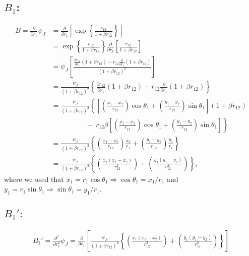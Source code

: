 \documentclass[a4paper,10pt]{article}
\newcommand{\pder}[2]{\frac{\partial #1}{\partial #2}}       %
\newcommand{\nn}{\nonumber}
\begin{document}
\subsection*{$B_1$:}
\begin{align}
B = \pder{}{r_1}\psi_J &= \pder{}{r_1} \left[ \exp\left\{\frac{r_{12}}{1+\beta r_{12}} \right\} \right] \nn\\
&= \exp\left\{\frac{r_{12}}{1+\beta r_{12}} \right\}\pder{}{r_1}\left[\frac{r_{12}}{1+\beta r_{12}} \right] \nn\\
&= \psi_J \left[\frac{\pder{r_{12}}{r_1}\left(1+\beta r_{12}\right)-r_{12} \pder{}{r_1}\left(1+\beta r_{12} \right)}{\left(1+\beta r_{12}\right)^2} \right] \nn\\
&= \frac{\psi_J}{\left(1+\beta r_{12}\right)^2}\left\{\pder{r_{12}}{r_1}\left(1+\beta r_{12}\right)-r_{12} \pder{}{r_1}\left(1+\beta r_{12} \right) \right\} \nn\\
&= \frac{\psi_J}{\left(1+\beta r_{12}\right)^2} \left\{\left[\left(\frac{x_1-x_2}{r_{12}}\right)\cos\theta_1 + \left(\frac{y_1-y_2}{r_{12}}\right)\sin\theta_1\right]\left(1+\beta r_{12}\right) \right. \nn\\
& \left. \ \ \ \ \ \ \ \ \ \ \ \ \ \ \ \ \ \ \ \ \ \ - \  r_{12} \beta \left[\left(\frac{x_1-x_2}{r_{12}}\right)\cos\theta_1 + \left(\frac{y_1-y_2}{r_{12}}\right)\sin\theta_1 \right]  \right\} \nn\\
&= \frac{\psi_J}{\left(1+\beta r_{12}\right)^2} \left\{\left(\frac{x_1-x_2}{r_{12}}\right)\frac{x_1}{r_1} + \left(\frac{y_1-y_2}{r_{12}}\right)\frac{y_1}{r_1} \right\} \nn\\
&= \frac{\psi_J}{\left(1+\beta r_{12}\right)^2} \left\{\left(\frac{x_1(x_1-x_2)}{r_{12}^2}\right) + \left(\frac{y_1(y_1-y_2)}{r_{12}^2}\right)\right\},
\end{align}
where we used that $x_1=r_1\cos\theta_1\Rightarrow \cos\theta_1=x_1/r_1$ and $y_1=r_1\sin\theta_1 \Rightarrow \sin\theta_1=y_1/r_1$.


\subsection*{$B_1':$}
\begin{align}
B_1' = \pder{^2}{r_1^2}\psi_J = \pder{}{r_1}\left[\frac{\psi_J}{\left(1+\beta r_{12}\right)^2} \left\{\left(\frac{x_1(x_1-x_2)}{r_{12}^2}\right) + \left(\frac{y_1(y_1-y_2)}{r_{12}^2}\right)\right\} \right] 
\end{align}
\end{document}
